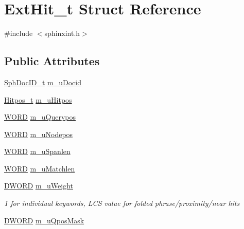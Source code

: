 \hypertarget{structExtHit__t}{\section{Ext\-Hit\-\_\-t Struct Reference}
\label{structExtHit__t}
}


{\ttfamily \#include $<$sphinxint.\-h$>$}

\subsection*{Public Attributes}
\begin{DoxyCompactItemize}
\item 
\hyperlink{sphinx_8h_a3176771631c12a9e4897272003e6b447}{Sph\-Doc\-I\-D\-\_\-t} \hyperlink{structExtHit__t_aeeb4c8b597e1e30fd21071cdf705f2e0}{m\-\_\-u\-Docid}
\item 
\hyperlink{sphinx_8h_af1385e83d53e0648b15eae6d8f101847}{Hitpos\-\_\-t} \hyperlink{structExtHit__t_a41d3b564c98eb634ba5e9023c0377d6e}{m\-\_\-u\-Hitpos}
\item 
\hyperlink{sphinxstd_8h_a197942eefa7db30960ae396d68339b97}{W\-O\-R\-D} \hyperlink{structExtHit__t_aed20dada6b9dde4ddb6f19cacd771986}{m\-\_\-u\-Querypos}
\item 
\hyperlink{sphinxstd_8h_a197942eefa7db30960ae396d68339b97}{W\-O\-R\-D} \hyperlink{structExtHit__t_a2fbd01527bb12881c9f8e1125a8e1047}{m\-\_\-u\-Nodepos}
\item 
\hyperlink{sphinxstd_8h_a197942eefa7db30960ae396d68339b97}{W\-O\-R\-D} \hyperlink{structExtHit__t_a5e23d4898a6a0ac97c8047a4425f9bc4}{m\-\_\-u\-Spanlen}
\item 
\hyperlink{sphinxstd_8h_a197942eefa7db30960ae396d68339b97}{W\-O\-R\-D} \hyperlink{structExtHit__t_ac47022c7c08d0bee709e7a4974753f95}{m\-\_\-u\-Matchlen}
\item 
\hyperlink{sphinxstd_8h_a798af1e30bc65f319c1a246cecf59e39}{D\-W\-O\-R\-D} \hyperlink{structExtHit__t_a10adc697543b6239dab714a670a2cf39}{m\-\_\-u\-Weight}
\begin{DoxyCompactList}\small\item\em 1 for individual keywords, L\-C\-S value for folded phrase/proximity/near hits \end{DoxyCompactList}\item 
\hyperlink{sphinxstd_8h_a798af1e30bc65f319c1a246cecf59e39}{D\-W\-O\-R\-D} \hyperlink{structExtHit__t_a44641c915e72ca70cf70d46c99f576ed}{m\-\_\-u\-Qpos\-Mask}
\end{DoxyCompactItemize}


